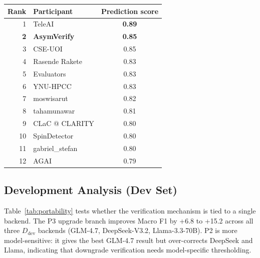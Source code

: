 \documentclass[11pt]{article}
\begin{document}
\begin{center}
\small
\setlength{\tabcolsep}{4pt}
\begin{tabular}{@{}r p{2.5cm} c@{}}
\toprule
\textbf{Rank} & \textbf{Participant} & \textbf{Prediction score} \\
\midrule
1 & TeleAI & \textbf{0.89} \\
\textbf{2} & \textbf{AsymVerify} & \textbf{0.85} \\
3 & CSE-UOI & 0.85 \\
4 & Rasende Rakete & 0.83 \\
5 & Evaluators & 0.83 \\
6 & YNU-HPCC & 0.83 \\
7 & moswisarut & 0.82 \\
8 & tahamunawar & 0.81 \\
9 & CLaC @ CLARITY & 0.80 \\
10 & SpinDetector & 0.80 \\
11 & gabriel\_stefan & 0.80 \\
12 & AGAI & 0.79 \\
\bottomrule
\end{tabular}
\label{tab:results}
\end{center}

\subsection{Development Analysis (Dev Set)}

Table~\ref{tab:portability} tests whether the verification mechanism is tied to a single backend. The P3 upgrade branch improves Macro F1 by +6.8 to +15.2 across all three $D_{\text{dev}}$ backends (GLM-4.7, DeepSeek-V3.2, Llama-3.3-70B). P2 is more model-sensitive: it gives the best GLM-4.7 result but over-corrects DeepSeek and Llama, indicating that downgrade verification needs model-specific thresholding.
\end{document}
